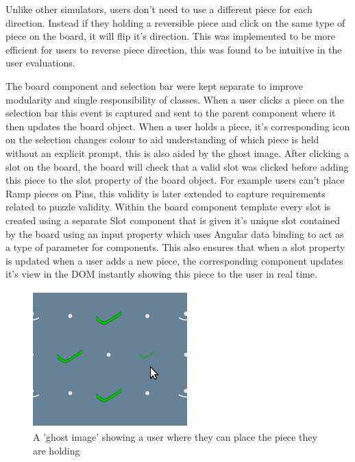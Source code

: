 \documentclass{l4proj}
\begin{document}
Unlike other simulators, users don't need to use a different piece for each direction. Instead if they holding a reversible piece and click on the same type of piece on the board, it will flip it's direction. This was implemented to be more efficient for users to reverse piece direction, this was found to be intuitive in the user evaluations. 

The board component and selection bar were kept separate to improve modularity and single responsibility of classes. When a user clicks a piece on the selection bar this event is captured and sent to the parent component where it then updates the board object. When a user holds a piece, it's corresponding icon on the selection changes colour to aid understanding of which piece is held without an explicit prompt, this is also aided by the ghost image. After clicking a slot on the board, the board will check that a valid slot was clicked before adding this piece to the slot property of the board object. For example users can't place Ramp pieces on Pins, this validity is later extended to capture requirements related to puzzle validity. Within the board component template every slot is created using a separate Slot component that is given it's unique slot contained by the board using an input property which uses Angular data binding to act as a type of parameter for components. This also ensures that when a slot property is updated when a user adds a new piece, the corresponding component updates it's view in the DOM instantly showing this piece to the user in real time.



\begin{figure}
    \centering
    \includegraphics[width=0.4\linewidth]{images/ghostImage.png}
    \caption{A 'ghost image' showing a user where they can place the piece they are holding}
    \label{fig:ghostPiece}
\end{figure}
\end{document}
